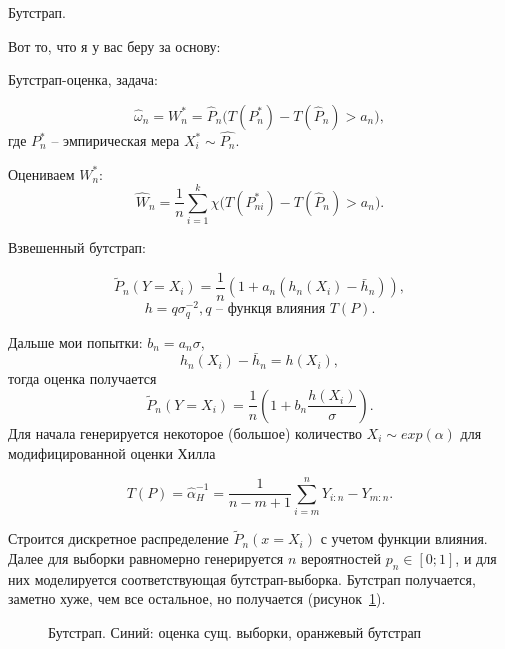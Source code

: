 \documentclass[12pt, specialist, subf, substylefile = spbu.rtx]{disser}
\begin{document}
Бутстрап.
  
Вот то, что я у вас беру за основу:

Бутстрап-оценка, задача:

$$
\hat{\omega}_n = W^*_n = \hat{P}_n\big( T(P^*_n)-T(\hat{P}_n) > a_n \big),
$$
где $P^*_n$ -- эмпирическая мера $X^*_i \sim \hat{P_n}$.

Оцениваем $W^*_n$:
\begin{equation}\label{eq:w1}
\hat{W}_n = \frac{1}{n} \sum_{i=1}^k \chi\big( T(P^*_{ni})-T(\hat{P}_n) > a_n\big).
\end{equation}

Взвешенный бутстрап:

$$
\tilde{P}_n (Y=X_i) = \frac{1}{n}(1+a_n(h_n(X_i)-\bar{h}_n)),
$$
$$
h = q \sigma_q^{-2}, q\text{ -- функця влияния $T(P)$.}
$$


Дальше мои попытки: $b_n=a_n \sigma$, 
$$
h_n(X_i)-\bar{h}_n = h(X_i),
$$
тогда оценка получается
$$
\tilde{P}_n (Y=X_i) = \frac{1}{n}(1+b_n \frac{h(X_i)}{\sigma}).
$$
Для начала генерируется некоторое (большое) количество $X_i \sim exp(\alpha)$ для модифицированной оценки Хилла 

\begin{equation}\label{eq:w2}
T(P)=\hat{\alpha}_H^{-1}=\frac{1}{n-m+1} \sum\limits_{i=m}^n Y_{i:n}- Y_{m:n}.
\end{equation}

Строится дискретное распределение $\tilde{P}_n (x=X_i)$ с учетом функции влияния. Далее для выборки равномерно генерируется $n$ вероятностей $p_n \in [0;1]$, и для них моделируется соответствующая бутстрап-выборка. Бутстрап получается, заметно хуже, чем все остальное, но получается (рисунок~\ref{ris:plot_boots}). 

\begin{figure}[!!h]
\caption{Бутстрап. Синий: оценка сущ. выборки, оранжевый бутстрап}
\label{ris:plot_boots}
\end{figure}
\end{document}
